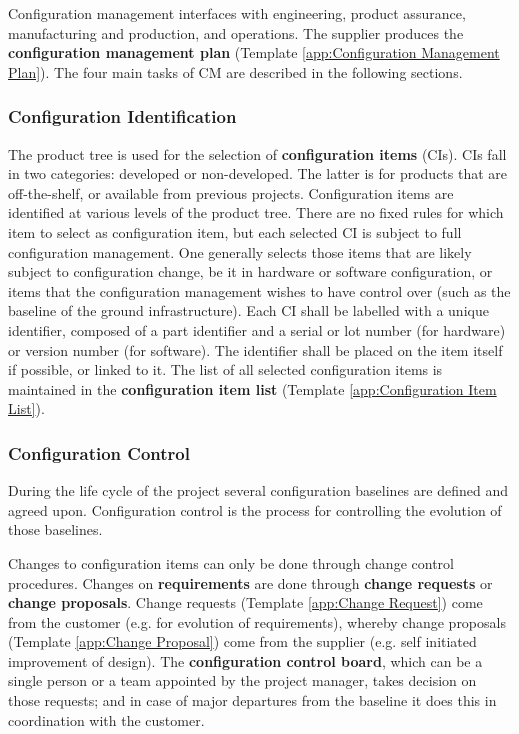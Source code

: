 Configuration management interfaces with engineering, product assurance, manufacturing and production, and operations. The supplier produces the \textbf{configuration management plan} (Template \ref{app:Configuration Management Plan}). The four main tasks of CM are described in the following sections.

\subsubsection{Configuration Identification}

The product tree is used for the selection of \textbf{configuration items} (CIs). CIs fall in two categories: developed or non-developed. The latter is for products that are off-the-shelf, or available from previous projects. Configuration items are identified at various levels of the product tree. There are no fixed rules for which item to select as configuration item, but each selected CI is subject to full configuration management. One generally selects those items that are likely subject to configuration change, be it in hardware or software configuration, or items that the configuration management wishes to have control over (such as the baseline of the ground infrastructure). Each CI shall be labelled with a unique identifier, composed of a part identifier and a serial or lot number (for hardware) or version number (for software). The identifier shall be placed on the item itself if possible, or linked to it. The list of all selected configuration items is maintained in the \textbf{configuration item list} (Template \ref{app:Configuration Item List}).

\subsubsection{Configuration Control}

During the life cycle of the project several configuration baselines are defined and agreed upon. Configuration control is the process for controlling the evolution of those baselines.

Changes to configuration items can only be done through change control procedures. Changes on \textbf{requirements} are done through \textbf{change requests} or \textbf{change proposals}. Change requests (Template \ref{app:Change Request}) come from the customer (e.g. for evolution of requirements), whereby change proposals (Template \ref{app:Change Proposal}) come from the supplier (e.g. self initiated improvement of design). The \textbf{configuration control board}, which can be a single person or a team appointed by the project manager, takes decision on those requests; and in case of major departures from the baseline it does this in coordination with the customer.

